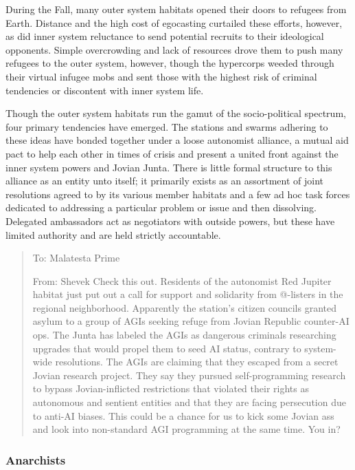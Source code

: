 During the Fall, many outer system habitats opened their doors to refugees from Earth. Distance and the high cost of egocasting curtailed these efforts, however, as did inner system reluctance to send potential recruits to their ideological opponents. Simple overcrowding and lack of resources drove them to push many refugees to the outer system, however, though the hypercorps weeded through their virtual infugee mobs and sent those with the highest risk of criminal tendencies or discontent with inner system life. 

Though the outer system habitats run the gamut of the socio-political spectrum, four primary tendencies have emerged. The stations and swarms adhering to these ideas have bonded together under a loose autonomist alliance, a mutual aid pact to help each other in times of crisis and present a united front against the inner system powers and Jovian Junta. There is little formal structure to this alliance as an entity unto itself; it primarily exists as an assortment of joint resolutions agreed to by its various member habitats and a few ad hoc task forces dedicated to addressing a particular problem or issue and then dissolving. Delegated ambassadors act as negotiators with outside powers, but these have limited authority and are held strictly accountable. 

\begin{quotation} To: Malatesta Prime 

From: Shevek Check this out. Residents of the autonomist Red Jupiter habitat just put out a call for support and solidarity from @-listers in the regional neighborhood. Apparently the station’s citizen councils granted asylum to a group of AGIs seeking refuge from Jovian Republic counter-AI ops. The Junta has labeled the AGIs as dangerous criminals researching upgrades that would propel them to seed AI status, contrary to system-wide resolutions. The AGIs are claiming that they escaped from a secret Jovian research project. They say they pursued self-programming research to bypass Jovian-inflicted restrictions that violated their rights as autonomous and sentient entities and that they are facing persecution due to anti-AI biases. This could be a chance for us to kick some Jovian ass and look into non-standard AGI programming at the same time. You in? \end{quotation} 

\subsubsection{Anarchists} \label{sec:anarchists} 

